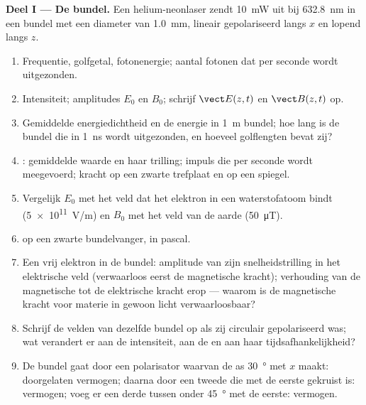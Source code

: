 \begin{problem}
\label{pb:b2:plane-waves-polarization:1}

\medskip
\noindent\textbf{Deel I --- De bundel.}
Een helium-neonlaser zendt \qty{10}{mW} uit bij \qty{632.8}{nm} in een
bundel met een diameter van \qty{1.0}{mm}, lineair gepolariseerd langs $x$
en lopend langs $z$.
\begin{enumerate}
  \item Frequentie, golfgetal, fotonenergie; aantal fotonen dat per seconde
        wordt uitgezonden.
  \item Intensiteit; amplitudes $E_0$ en $B_0$; schrijf $\vect E(z, t)$ en
        $\vect B(z, t)$ op.
  \item Gemiddelde energiedichtheid en de energie in \qty{1}{m} bundel; hoe
        lang is de bundel die in \qty{1}{ns} wordt uitgezonden, en hoeveel
        golflengten bevat zij?
  \item {}: gemiddelde waarde en haar trilling; impuls die per
        seconde wordt meegevoerd; kracht op een zwarte trefplaat en op een
        spiegel.
  \item Vergelijk $E_0$ met het veld dat het elektron in een waterstofatoom
        bindt (\qty{5e11}{V/m}) en $B_0$ met het veld van de aarde
        (\qty{50}{\micro T}).
  \item {} op een zwarte bundelvanger, in pascal.
  \item Een vrij elektron in de bundel: amplitude van zijn snelheidstrilling
        in het elektrische veld (verwaarloos eerst de magnetische kracht);
        verhouding van de magnetische tot de elektrische kracht erop ---
        waarom is de magnetische kracht voor materie in gewoon licht
        verwaarloosbaar?
  \item Schrijf de velden van dezelfde bundel op als zij circulair
        gepolariseerd was; wat verandert er aan de intensiteit, aan de
         en aan haar tijdsafhankelijkheid?
  \item De bundel gaat door een polarisator waarvan de as \qty{30}{\degree}
        met $x$ maakt: doorgelaten vermogen; daarna door een tweede die met
        de eerste gekruist is: vermogen; voeg er een derde tussen onder
        \qty{45}{\degree} met de eerste: vermogen.
\end{enumerate}


\end{problem}
